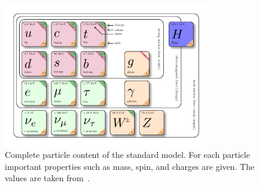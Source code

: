 \begin{figure}[tbp]
 \centering
 \includegraphics[width=0.8\textwidth]{figures/general/SM}
 \caption{Complete particle content of the standard model. For each particle important properties such as mass, spin, and charges are given. The values are taken from~\cite{PDG}.}
 \label{fig:SM}
 
\end{figure}


